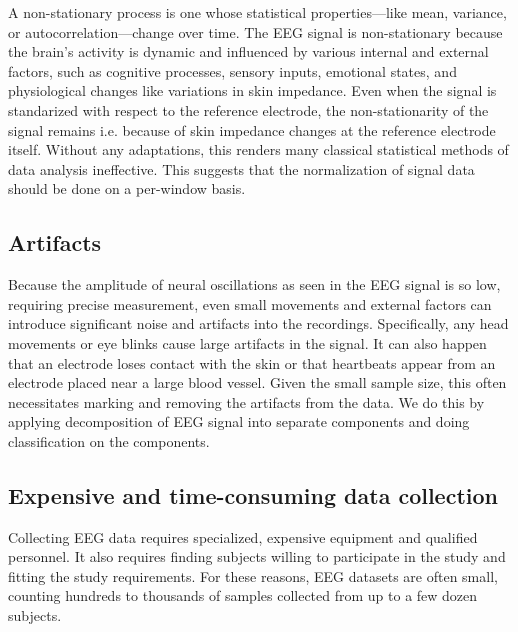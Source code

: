 A non-stationary process is one whose statistical properties---like mean, variance, or autocorrelation---change over time. 
The EEG signal is non-stationary\cite{nonstationary} because the brain's activity is dynamic and influenced by various internal and external factors, such as cognitive processes, sensory inputs, emotional states, and physiological changes like variations in skin impedance.
Even when the signal is standarized with respect to the reference electrode, the non-stationarity of the signal remains i.e. because of skin impedance changes at the reference electrode itself.
Without any adaptations, this renders many classical statistical methods of data analysis ineffective.
This suggests that the normalization of signal data should be done on a per-window basis.

\subsection{Artifacts}

Because the amplitude of neural oscillations as seen in the EEG signal is so low, requiring precise measurement, even small movements and external factors can introduce significant noise and artifacts into the recordings.
Specifically, any head movements or eye blinks cause large artifacts in the signal. It can also happen that an electrode loses contact with the skin or that heartbeats appear from an electrode placed near a large blood vessel.
Given the small sample size, this often necessitates marking and removing the artifacts from the data.
We do this by applying decomposition of EEG signal into separate components and doing classification on the components.

\subsection{Expensive and time-consuming data collection}

Collecting EEG data requires specialized, expensive equipment and qualified personnel.
It also requires finding subjects willing to participate in the study and fitting the study requirements.
For these reasons, EEG datasets are often small, counting hundreds to thousands of samples collected from up to a few dozen subjects.

